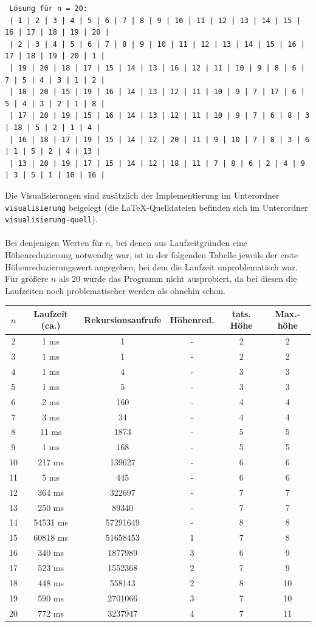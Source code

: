 \documentclass[a4paper, notitlepage, 12pt]{scrartcl}
\begin{document}
\begin{center}
\begin{Verbatim}
 Lösung für n = 20: 
 | 1 | 2 | 3 | 4 | 5 | 6 | 7 | 8 | 9 | 10 | 11 | 12 | 13 | 14 | 15 | 16 | 17 | 18 | 19 | 20 | 
 | 2 | 3 | 4 | 5 | 6 | 7 | 8 | 9 | 10 | 11 | 12 | 13 | 14 | 15 | 16 | 17 | 18 | 19 | 20 | 1 | 
 | 19 | 20 | 18 | 17 | 15 | 14 | 13 | 16 | 12 | 11 | 10 | 9 | 8 | 6 | 7 | 5 | 4 | 3 | 1 | 2 | 
 | 18 | 20 | 15 | 19 | 16 | 14 | 13 | 12 | 11 | 10 | 9 | 7 | 17 | 6 | 5 | 4 | 3 | 2 | 1 | 8 | 
 | 17 | 20 | 19 | 15 | 16 | 14 | 13 | 12 | 11 | 10 | 9 | 7 | 6 | 8 | 3 | 18 | 5 | 2 | 1 | 4 | 
 | 16 | 18 | 17 | 19 | 15 | 14 | 12 | 20 | 11 | 9 | 10 | 7 | 8 | 3 | 6 | 1 | 5 | 2 | 4 | 13 | 
 | 13 | 20 | 19 | 17 | 15 | 14 | 12 | 18 | 11 | 7 | 8 | 6 | 2 | 4 | 9 | 3 | 5 | 1 | 10 | 16 |   
 \end{Verbatim}
 \end{center} Die Visualisierungen sind zusätzlich der Implementierung im Unterordner \texttt{visualisierung} beigelegt (die LaTeX-Quelldateien befinden sich im Unterordner \texttt{visualisierung-quell}). \\ \\
 Bei denjenigen Werten für $n$, bei denen  aus Laufzeitgründen eine Höhenreduzierung notwendig war, ist in der folgenden Tabelle jeweils der erste Höhenreduzierungswert angegeben, bei dem die Laufzeit unproblematisch war. 
Für größere $n$ als 20 wurde das Programm nicht ausprobiert, da bei diesen die Laufzeiten noch problematischer werden als ohnehin schon.
 \begin{center}
 \begin{tabular}{|c|c|c|c|c|c|}
  \hline
 $n$ & Laufzeit (ca.) & Rekursionsaufrufe & Höhenred. & tats. Höhe & Max.-höhe \\ \hline
2 & 1 ms & 1 & - & 2& 2\\
3 & 1 ms & 1 & - & 2& 2\\
4 & 1 ms & 4 & - & 3& 3\\
5 & 1 ms & 5 & - & 3& 3\\
6 & 2 ms & 160 & - &4 & 4\\
7 & 3 ms & 34 & - & 4& 4\\
8 & 11 ms & 1873 & - &5 & 5\\
9 & 1 ms & 168 & - & 5& 5\\
10 & 217 ms & 139627 & - &6 & 6\\
11 & 5 ms & 445 & - & 6& 6\\
12 & 364 ms & 322697 & - & 7& 7\\
13 & 250 ms & 89340 & - & 7& 7\\
14 & 54531 ms & 57291649 & - &8 & 8\\ \hline \hline
15 & 60818 ms & 51658453 & 1 & 7& 8\\
16 & 340 ms & 1877989 & 3 & 6& 9\\
17 & 523 ms & 1552368 & 2 & 7& 9\\
18 & 448 ms & 558143 & 2 & 8& 10\\
19 & 590 ms & 2701066 & 3 & 7& 10\\
20 & 772 ms & 3237947 & 4 & 7& 11\\ \hline
 \end{tabular}
 \end{center}
\end{document}
